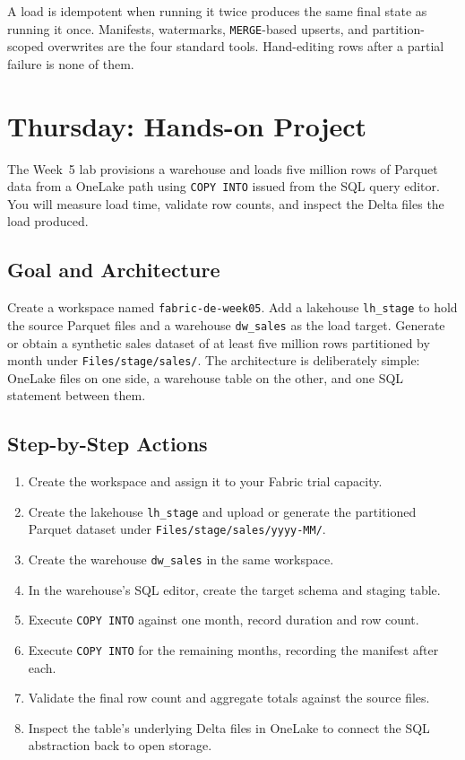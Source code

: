 \begin{notebox}
A load is idempotent when running it twice produces the same final state as running it once. Manifests, watermarks, \texttt{MERGE}-based upserts, and partition-scoped overwrites are the four standard tools. Hand-editing rows after a partial failure is none of them.
\end{notebox}

\section{Thursday: Hands-on Project}
The Week~5 lab provisions a warehouse and loads five million rows of Parquet data from a OneLake path using \texttt{COPY INTO} issued from the SQL query editor. You will measure load time, validate row counts, and inspect the Delta files the load produced.

\subsection{Goal and Architecture}
Create a workspace named \texttt{fabric-de-week05}. Add a lakehouse \texttt{lh\_stage} to hold the source Parquet files and a warehouse \texttt{dw\_sales} as the load target. Generate or obtain a synthetic sales dataset of at least five million rows partitioned by month under \texttt{Files/stage/sales/}. The architecture is deliberately simple: OneLake files on one side, a warehouse table on the other, and one SQL statement between them.

\subsection{Step-by-Step Actions}
\begin{enumerate}
    \item Create the workspace and assign it to your Fabric trial capacity.
    \item Create the lakehouse \texttt{lh\_stage} and upload or generate the partitioned Parquet dataset under \texttt{Files/stage/sales/yyyy-MM/}.
    \item Create the warehouse \texttt{dw\_sales} in the same workspace.
    \item In the warehouse's SQL editor, create the target schema and staging table.
    \item Execute \texttt{COPY INTO} against one month, record duration and row count.
    \item Execute \texttt{COPY INTO} for the remaining months, recording the manifest after each.
    \item Validate the final row count and aggregate totals against the source files.
    \item Inspect the table's underlying Delta files in OneLake to connect the SQL abstraction back to open storage.
\end{enumerate}

